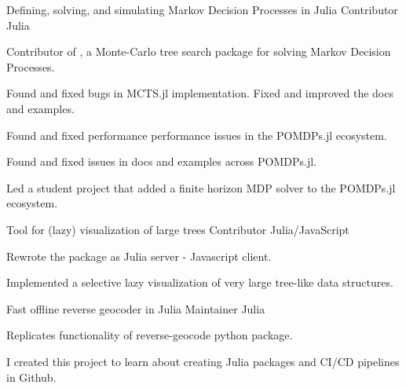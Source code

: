 

\begin{cventries}

  \cventry
    {Defining, solving, and simulating Markov Decision Processes in Julia} %
    {
    } %
    {Contributor} %
    {Julia} %
    {
      \begin{cvitems} %
        \item {Contributor of , a Monte-Carlo tree search package for solving Markov Decision Processes.}
        \item {Found and fixed bugs in MCTS.jl implementation. Fixed and improved the docs and examples.}
        \item {Found and fixed performance performance issues in the POMDPs.jl ecosystem.}
        \item {Found and fixed issues in docs and examples across POMDPs.jl.}
        \item {Led a student project that added a finite horizon MDP solver to the POMDPs.jl ecosystem.}
      \end{cvitems}
    }
    
  \cventry
    {Tool for (lazy) visualization of large trees} %
    {} %
    {Contributor} %
    {Julia/JavaScript} %
    {
      \begin{cvitems} %
        \item{Rewrote the package as Julia server - Javascript client.}
        \item{Implemented a selective lazy visualization of very large tree-like data structures.}
      \end{cvitems}
    }

  \cventry
    {Fast offline reverse geocoder in Julia}
    {}
    {Maintainer}
    {Julia} 
    {
      \begin{cvitems} %
        \item {Replicates functionality of reverse-geocode python package.}
        \item {I created this project to learn about creating Julia packages and CI/CD pipelines in Github.}
      \end{cvitems}
    }


\end{cventries}

